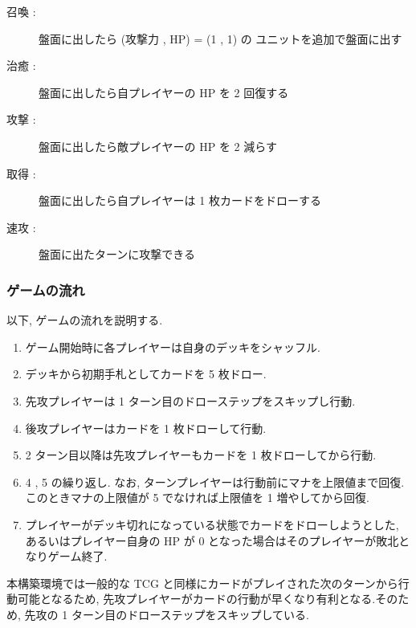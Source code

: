 \documentclass[12pt]{jarticle}
\begin{document}
\begin{description}
  \item[召喚 :]  盤面に出したら (攻撃力 , HP) = (1 , 1) の
  ユニットを追加で盤面に出す
  \item[治癒 :]  盤面に出したら自プレイヤーの HP を 2 回復する
  \item[攻撃 :]  盤面に出したら敵プレイヤーの HP を 2 減らす
  \item[取得 :]  盤面に出したら自プレイヤーは 1 枚カードをドローする
  \item[速攻 :]  盤面に出たターンに攻撃できる
\end{description}

\subsubsection{ゲームの流れ}
以下, ゲームの流れを説明する.
\begin{enumerate}
  \setlength{\itemsep}{0cm} %
  \item ゲーム開始時に各プレイヤーは自身のデッキをシャッフル.
  \item デッキから初期手札としてカードを 5 枚ドロー. 
  \item 先攻プレイヤーは 1 ターン目のドローステップをスキップし行動.
  \item 後攻プレイヤーはカードを 1 枚ドローして行動.
  \item 2 ターン目以降は先攻プレイヤーもカードを 1 枚ドローしてから行動. 
  \item 4 , 5 の繰り返し. なお, ターンプレイヤーは行動前にマナを上限値まで回復. このときマナの上限値が 5 でなければ上限値を 1 増やしてから回復.
  \item プレイヤーがデッキ切れになっている状態でカードをドローしようとした, あるいはプレイヤー自身の HP が 0 となった場合はそのプレイヤーが敗北となりゲーム終了.
\end{enumerate}
\par
本構築環境では一般的な TCG と同様にカードがプレイされた次のターンから行動可能となるため, 先攻プレイヤーがカードの行動が早くなり有利となる.そのため, 先攻の 1 ターン目のドローステップをスキップしている. 
\end{document}
